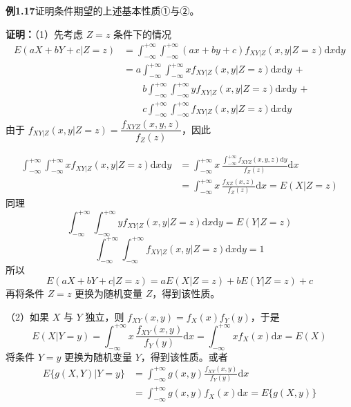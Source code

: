 \documentclass[11pt,openany,UTF8]{ctexbook}
\newcommand{\dif}{\mathrm{d}}                      %
\begin{document}
\begin{examplebox}
\textbf{例1.17}\quad 证明条件期望的上述基本性质①与②\nobreak。

\textbf{证明\nobreak：}（1\nobreak）先考虑 $Z=z$ 条件下的情况
\[
\begin{aligned}
E(aX+bY+c|Z=z)&=\int_{-\infty}^{+\infty}\!\!\int_{-\infty}^{+\infty}
  (ax+by+c)f_{XY|Z}(x,y|Z=z)\dif x\dif y\\
&=a\int_{-\infty}^{+\infty}\!\!\int_{-\infty}^{+\infty}xf_{XY|Z}(x,y|Z=z)\dif x\dif y\,+\\
&\qquad b\int_{-\infty}^{+\infty}\!\!\int_{-\infty}^{+\infty}yf_{XY|Z}(x,y|Z=z)\dif x\dif y\,+\\
&\qquad c\int_{-\infty}^{+\infty}\!\!\int_{-\infty}^{+\infty}f_{XY|Z}(x,y|Z=z)\dif x\dif y
\end{aligned}
\]
由于 $f_{XY|Z}(x,y|Z=z)=\dfrac{f_{XYZ}(x,y,z)}{f_Z(z)}$\nobreak，因此

\[
\begin{aligned}
\int_{-\infty}^{+\infty}\!\!\int_{-\infty}^{+\infty}xf_{XY|Z}(x,y|Z=z)\dif x\dif y
&=\int_{-\infty}^{+\infty}x\,\frac{\int_{-\infty}^{+\infty}f_{XYZ}(x,y,z)\dif y}{f_Z(z)}\dif x\\
&=\int_{-\infty}^{+\infty}x\,\frac{f_{XZ}(x,z)}{f_Z(z)}\dif x=E(X|Z=z)
\end{aligned}
\]
同理
\[
\int_{-\infty}^{+\infty}\!\!\int_{-\infty}^{+\infty}yf_{XY|Z}(x,y|Z=z)\dif x\dif y=E(Y|Z=z)
\]
\[
\int_{-\infty}^{+\infty}\!\!\int_{-\infty}^{+\infty}f_{XY|Z}(x,y|Z=z)\dif x\dif y=1
\]
所以
\[
E(aX+bY+c|Z=z)=aE(X|Z=z)+bE(Y|Z=z)+c
\]
再将条件 $Z=z$ 更换为随机变量 $Z$\nobreak，得到该性质\nobreak。

（2\nobreak）如果 $X$ 与 $Y$ 独立\nobreak，则 $f_{XY}(x,y)=f_X(x)f_Y(y)$\nobreak，于是
\[
E(X|Y=y)=\int_{-\infty}^{+\infty}x\,\frac{f_{XY}(x,y)}{f_Y(y)}\dif x
=\int_{-\infty}^{+\infty}xf_X(x)\dif x=E(X)
\]
将条件 $Y=y$ 更换为随机变量 $Y$\nobreak，得到该性质\nobreak。或者
\[
\begin{aligned}
E\{g(X,Y)|Y=y\}&=\int_{-\infty}^{+\infty}g(x,y)\frac{f_{XY}(x,y)}{f_Y(y)}\dif x\\
&=\int_{-\infty}^{+\infty}g(x,y)f_X(x)\dif x=E\{g(X,y)\}
\end{aligned}
\]
\end{examplebox}
\end{document}
